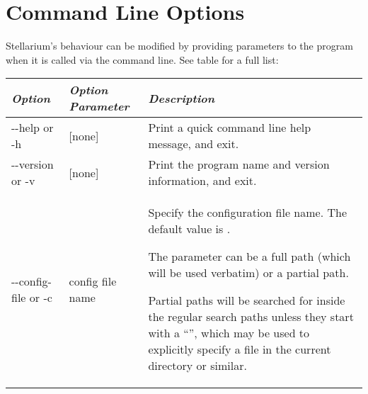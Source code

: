 \chapter{Command Line Options}
\label{sec:CommandLineOptions}

Stellarium's behaviour can be modified by providing parameters to the
program when it is called via the command line. See table for a full list:

\begin{longtabu} to \textwidth {l|l|X}\toprule
\emph{Option}         & \emph{Option Parameter} & \emph{Description}\\\midrule
-\/-help or -h        & {[}none{]}       & Print a quick command line help message, and exit. \\\midrule
-\/-version or -v     & {[}none{]}       & Print the program name and version information, and exit. \\\midrule
-\/-config-file or -c & config file name & Specify the configuration file name. The default value is .

The parameter can be a full path (which will be used verbatim) or a partial path.

Partial paths will be searched for inside the regular search paths
unless they start with a ``'', which may be used to explicitly
specify a file in the current directory or similar.


\end{longtabu}
